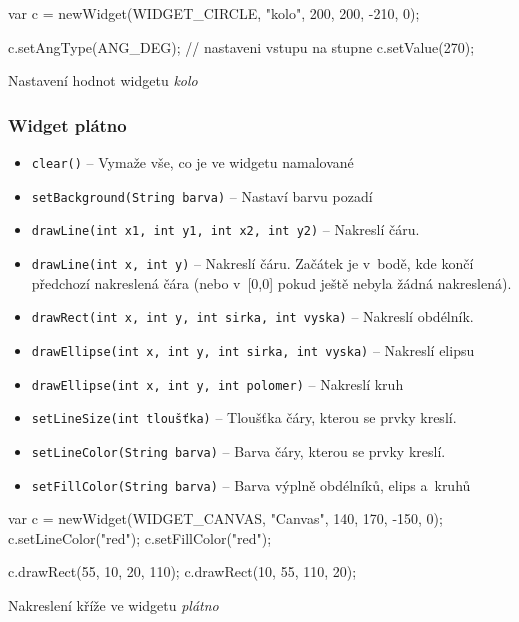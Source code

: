 \documentclass[12pt, a4paper, oneside]{article}
\newcommand{\It}{\textit}  %
\begin{document}
\begin{listing}[H]
\begin{jscode}
var c = newWidget(WIDGET_CIRCLE, "kolo", 200, 200, -210, 0);

c.setAngType(ANG_DEG); // nastaveni vstupu na stupne
c.setValue(270);
\end{jscode}
\caption{Nastavení hodnot widgetu \It{kolo}}
\end{listing}

\subsubsection*{Widget plátno}
\begin{itemize}
    \item {\color{blue}\verb/clear()/} -- Vymaže vše, co je ve widgetu namalované
    \item {\color{blue}\verb/setBackground(String barva)/} -- Nastaví barvu pozadí
    \item {\color{blue}\verb/drawLine(int x1, int y1, int x2, int y2)/} -- Nakreslí čáru.
    \item {\color{blue}\verb/drawLine(int x, int y)/} -- Nakreslí čáru. Začátek je v~bodě, kde končí předchozí nakreslená čára (nebo v~[0,0] pokud ještě nebyla žádná nakreslená).
    \item {\color{blue}\verb/drawRect(int x, int y, int sirka, int vyska)/} -- Nakreslí obdélník.
    \item {\color{blue}\verb/drawEllipse(int x, int y, int sirka, int vyska)/} -- Nakreslí elipsu
    \item {\color{blue}\verb/drawEllipse(int x, int y, int polomer)/} -- Nakreslí kruh
    \item {\color{blue}\verb/setLineSize(int tloušťka)/} -- Tloušťka čáry, kterou se prvky kreslí.
    \item {\color{blue}\verb/setLineColor(String barva)/} -- Barva čáry, kterou se prvky kreslí.
    \item {\color{blue}\verb/setFillColor(String barva)/} -- Barva výplně obdélníků, elips a~kruhů
\end{itemize}

\begin{listing}[H]
\begin{jscode}
var c = newWidget(WIDGET_CANVAS, "Canvas", 140, 170, -150, 0);
c.setLineColor("red");
c.setFillColor("red");

c.drawRect(55, 10, 20, 110);
c.drawRect(10, 55, 110, 20);
\end{jscode}
\caption{Nakreslení kříže ve widgetu \It{plátno}}
\end{listing}
\end{document}
